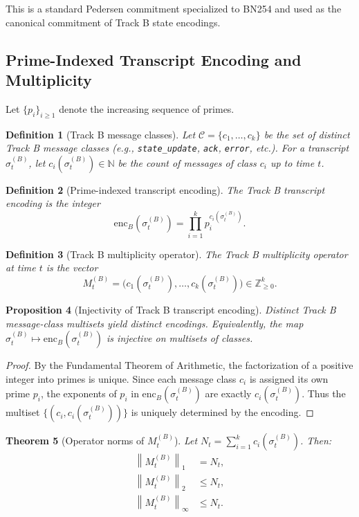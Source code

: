 \documentclass[11pt]{article}
\newtheorem{definition}{Definition}[section]
\newtheorem{theorem}[definition]{Theorem}
\newtheorem{proposition}[definition]{Proposition}
\newcommand{\Z}{\mathbb{Z}}
\newcommand{\N}{\mathbb{N}}
\newcommand{\norm}[1]{\left\lVert #1 \right\rVert}
\begin{document}
This is a standard Pedersen commitment specialized to BN254 and used as the canonical commitment of Track B state encodings.

\subsection{Prime-Indexed Transcript Encoding and Multiplicity}

Let \(\{p_i\}_{i \ge 1}\) denote the increasing sequence of primes.

\begin{definition}[Track B message classes]
Let \(\mathcal{C} = \{c_1, \dots, c_k\}\) be the set of distinct Track B message classes (e.g., \texttt{state\_update}, \texttt{ack}, \texttt{error}, etc.).
For a transcript \(\sigma_t^{(B)}\), let \(c_i(\sigma_t^{(B)}) \in \N\) be the count of messages of class \(c_i\) up to time \(t\).
\end{definition}

\begin{definition}[Prime-indexed transcript encoding]
The Track B transcript encoding is the integer
\[
  \mathrm{enc}_B(\sigma_t^{(B)}) = \prod_{i=1}^k p_i^{c_i(\sigma_t^{(B)})}.
\]
\end{definition}

\begin{definition}[Track B multiplicity operator]
The Track B multiplicity operator at time \(t\) is the vector
\[
  M_t^{(B)} = \bigl(c_1(\sigma_t^{(B)}), \dots, c_k(\sigma_t^{(B)})\bigr) \in \Z_{\ge 0}^k.
\]
\end{definition}

\begin{proposition}[Injectivity of Track B transcript encoding]
Distinct Track B message-class multisets yield distinct encodings.
Equivalently, the map
\(
\sigma_t^{(B)} \mapsto \mathrm{enc}_B(\sigma_t^{(B)})
\)
is injective on multisets of classes.
\end{proposition}

\begin{proof}
By the Fundamental Theorem of Arithmetic, the factorization of a positive integer into primes is unique.
Since each message class \(c_i\) is assigned its own prime \(p_i\), the exponents of \(p_i\) in \(\mathrm{enc}_B(\sigma_t^{(B)})\) are exactly \(c_i(\sigma_t^{(B)})\).
Thus the multiset \(\bigl\{(c_i, c_i(\sigma_t^{(B)}))\bigr\}\) is uniquely determined by the encoding.
\end{proof}

\begin{theorem}[Operator norms of \(M_t^{(B)}\)]
Let \(N_t = \sum_{i=1}^k c_i(\sigma_t^{(B)})\).
Then:
\begin{align*}
  \norm{M_t^{(B)}}_1 &= N_t, \\
  \norm{M_t^{(B)}}_2 &\le N_t, \\
  \norm{M_t^{(B)}}_\infty &\le N_t.
\end{align*}
\end{theorem}
\end{document}
